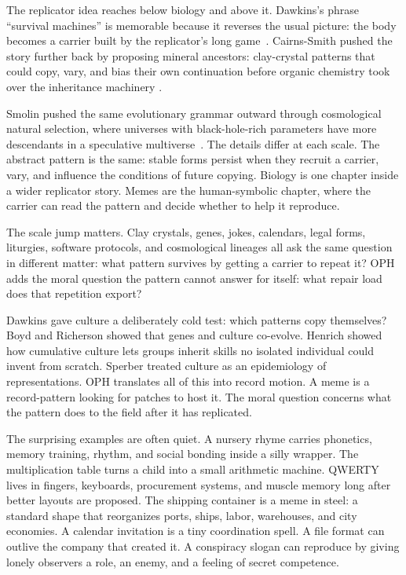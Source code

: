 \documentclass[11pt]{article}
\theoremstyle{remark}
\theoremstyle{plain}
\begin{document}
The replicator idea reaches below biology and above it. Dawkins's phrase
``survival machines'' is memorable because it reverses the usual picture: the
body becomes a carrier built by the replicator's long game~\cite{Dawkins1976}.
Cairns-Smith pushed the story further back by proposing mineral ancestors:
clay-crystal patterns that could copy, vary, and bias their own continuation
before organic chemistry took over the inheritance machinery
\cite{CairnsSmith1982}.

Smolin pushed the same evolutionary grammar outward through cosmological
natural selection, where universes with black-hole-rich parameters have more
descendants in a speculative multiverse~\cite{Smolin1997}. The details differ
at each scale. The abstract pattern is the same: stable forms persist when they
recruit a carrier, vary, and influence the conditions of future copying.
Biology is one chapter inside a wider replicator story. Memes are the
human-symbolic chapter, where the carrier can read the pattern and decide
whether to help it reproduce.

The scale jump matters. Clay crystals, genes, jokes, calendars, legal forms,
liturgies, software protocols, and cosmological lineages all ask the same
question in different matter: what pattern survives by getting a carrier to
repeat it? OPH adds the moral question the pattern cannot answer for itself:
what repair load does that repetition export?

Dawkins gave culture a deliberately cold test: which patterns copy themselves?
Boyd and Richerson showed that genes and culture co-evolve. Henrich showed how
cumulative culture lets groups inherit skills no isolated individual could
invent from scratch. Sperber treated culture as an epidemiology of
representations. OPH translates all of this into record motion. A meme is a
record-pattern looking for patches to host it. The moral question concerns what
the pattern does to the field after it has replicated.

The surprising examples are often quiet. A nursery rhyme carries phonetics,
memory training, rhythm, and social bonding inside a silly wrapper. The
multiplication table turns a child into a small arithmetic machine. QWERTY lives
in fingers, keyboards, procurement systems, and muscle memory long after better
layouts are proposed. The shipping container is a meme in steel: a standard
shape that reorganizes ports, ships, labor, warehouses, and city economies. A
calendar invitation is a tiny coordination spell. A file format can outlive the
company that created it. A conspiracy slogan can reproduce by giving lonely
observers a role, an enemy, and a feeling of secret competence.
\end{document}

